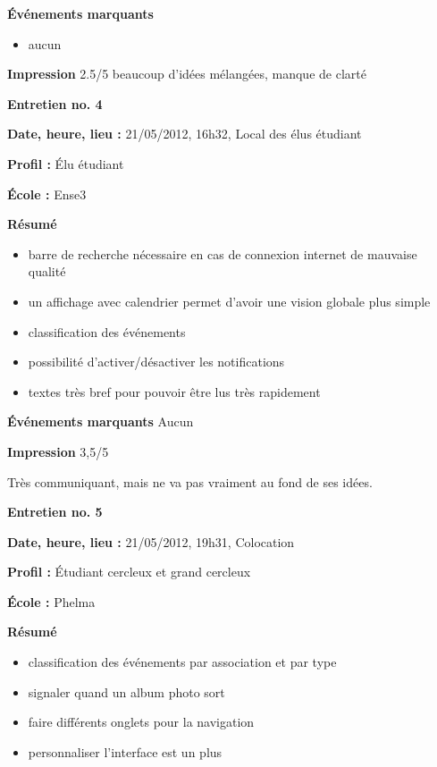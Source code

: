 \documentclass[a4paper, 11px]{article}
\begin{document}
\vspace{.25cm}
\textbf{Événements marquants}
	\begin{itemize}
		\item aucun
	\end{itemize}

\vspace{.25cm}
\textbf{Impression} 2.5/5 beaucoup d'idées mélangées, manque de clarté



\vspace{.3cm}

 \textbf {\large Entretien no. 4}

\textbf{Date, heure, lieu : }
21/05/2012, 16h32, Local des élus étudiant

\textbf{Profil : }
Élu étudiant

\textbf{École : }
Ense3

\textbf{Résumé}
	\begin{itemize}
		\item barre de recherche nécessaire en cas de connexion internet de mauvaise qualité
		\item un affichage avec calendrier permet d'avoir une vision globale plus simple
		\item classification des événements
		\item possibilité d'activer/désactiver les notifications
		\item textes très bref pour pouvoir être lus très rapidement
	\end{itemize}
\vspace{.25cm}

\textbf{Événements marquants}
Aucun


\textbf{Impression} 3,5/5

Très communiquant, mais ne va pas vraiment au fond de ses idées.



\vspace{.3cm}

 \textbf {\large Entretien no. 5}

\textbf{Date, heure, lieu : }
21/05/2012, 19h31, Colocation

\textbf{Profil : }
Étudiant cercleux et grand cercleux


\textbf{École : }
Phelma

\textbf{Résumé}
	\begin{itemize}
		\item classification des événements par association et par type
		\item signaler quand un album photo sort
		\item faire différents onglets pour la navigation
		\item personnaliser l'interface est un plus
	\end{itemize}
\vspace{.25cm}
\end{document}
